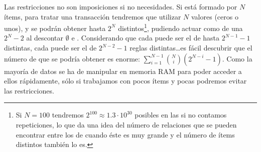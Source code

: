 Las restricciones no son imposiciones si no necesidades. Si \I está formado por $N$ ítems, para tratar una transacción tendremos que utilizar $N$ valores (ceros o unos), y se podrán obtener hasta $2^N$ \itemsets distintos\footnote{Si $N=100$ tendremos $2^{100}\approx1.3\cdot10^{30}$ posibles \itemsets en las \transacciones si no contamos repeticiones, lo que da una idea del número de relaciones que se pueden encontrar entre los \itemsets de \D cuando éste es muy grande y el número de ítems distintos también lo es.}, pudiendo actuar como \antecedente de una \ar $2^N-2$ al descontar $\emptyset$ e \I. Considerando que cada \kitemset[1] puede ser el \antecedente de hasta $2^{N-1}-1$ \ars distintas, cada \kitemset[2] puede ser el \antecedente de $2^{N-2}-1$ reglas distintas\ldots es fácil descubrir que el número de \ARs que se podría obtener es enorme: $\sum_{i=1}^{N-1}{{N \choose i}(2^{N-i}-1)}$. Como la mayoría de datos se ha de manipular en memoria RAM para poder acceder a ellos rápidamente, sólo si trabajamos con pocos ítems y pocas \transacciones podremos evitar las restricciones.
